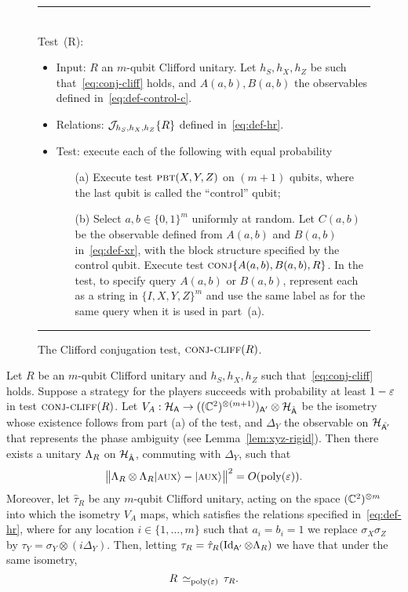 \begin{figure}[H]
\rule[1ex]{\textwidth}{0.5pt}\\
Test~\conjc(R): 
\begin{itemize}
    \item Input: $R$ an $m$-qubit Clifford unitary. 	Let $h_S,h_X,h_Z$ be such that~\eqref{eq:conj-cliff} holds, and $A(a,b),B(a,b)$ the observables defined in~\eqref{eq:def-control-c}. 
    \item Relations: $\mathcal{J}\!_{h_S,h_X,h_Z}\{R\}$ defined in~\eqref{eq:def-hr}. 
    \item Test: execute each of the following with equal probability
\begin{enumerate}
\item[(a)] Execute test $\textsc{pbt}(X,Y,Z)$ on $(m+1)$ qubits, where the last qubit is called the ``control'' qubit;
\item[(b)] Select $a,b\in\{0,1\}^m$ uniformly at random. Let $C(a,b)$ be the observable defined from $A(a,b)$ and $B(a,b)$ in~\eqref{eq:def-xr}, with the block structure specified by the control qubit. Execute test $\textsc{conj}\{A(a,b),B(a,b),R\}$. In the test, to specify query $A(a,b)$ or $B(a,b)$, represent each as a string in $\{I,X,Y,Z\}^m$ and use the same label as for the same query when it is used in part~(a).
\end{enumerate}
\end{itemize}
\rule[2ex]{\textwidth}{0.5pt}\vspace{-0.5cm}
\caption{The Clifford conjugation test, $\textsc{conj-cliff}(R)$.}
\label{fig:conjugation-test-2}
\end{figure}



\begin{lemma}\label{lem:cliff-conj}
Let $R$ be an $m$-qubit Clifford unitary and $h_S,h_X,h_Z$ such that~\eqref{eq:conj-cliff} holds. Suppose a strategy for the players succeeds with probability at least $1-\varepsilon$ in test $\textsc{conj-cliff}(R)$. Let $V_A:\mathcal{H}_{\textsf{A}} \to ((\mathbb{C}^2)^{\otimes (m+1)})_{{\textsf{A}}'}  \otimes {\mathcal{H}}_{\hat{{\textsf{A}}}}$ be the isometry whose existence follows from part (a) of the test, and $\Delta_Y$ the observable on $\mathcal{H}_{\hat{{\textsf{A}}'}}$ that represents the phase ambiguity (see Lemma~\ref{lem:xyz-rigid}). 
Then there exists a unitary $\Lambda_R$ on ${\mathcal{H}}_{\hat{{\textsf{A}}}}$, commuting with $\Delta_Y$, such that 
\begin{equation}\label{eq:r-stab}
 \big\|\Lambda_R \otimes \Lambda_R |\textsc {aux}\rangle - |\textsc {aux}\rangle \big\|^2 = O(\operatorname{poly}(\varepsilon)).
\end{equation}
Moreover, let $\hat{\tau}_R$ be any $m$-qubit Clifford unitary, acting on the space $(\mathbb{C}^2)^{\otimes m}$ into which the isometry $V_A$ maps, which satisfies the relations specified in~\eqref{eq:def-hr}, where for any location $i\in\{1,\ldots,m\}$ such that $a_i=b_i=1$ we replace $\sigma_X\sigma_Z$ by $\tau_Y = \sigma_Y \otimes (i\Delta_Y)$. Then, letting  $ \tau_R = \hat{\tau}_{R}(\mathop{\rm Id}\nolimits_{{\textsf{A}}'} \otimes \Lambda_R)$ we have that  under the same isometry,
$$R \,\simeq_{\operatorname{poly}(\varepsilon)}\, \tau_R.$$
\end{lemma}

